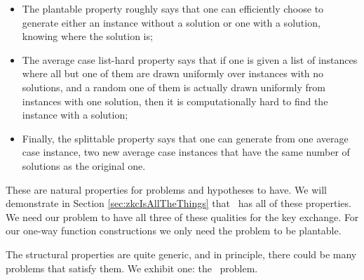 \begin{itemize}
	\item The plantable property roughly says that one can efficiently choose to generate either an instance without a solution or one with a solution, knowing where the solution is; %
	\item The average case list-hard property says that if one is given a list of instances where all but one of them are drawn uniformly over instances with no solutions, and a random one of them is actually drawn uniformly from instances with one solution, then it is computationally hard to find the instance with a solution;
	\item Finally, the splittable property says that one can generate from one average case instance, two new average case instances that have the same number of solutions as the original one. %
\end{itemize}
These are natural properties for problems and hypotheses to have. We will demonstrate in Section \ref{sec:zkcIsAllTheThings} that \zkclique~has all of these properties. We need our problem to have all three of these qualities for the key exchange. For our one-way function constructions we only need the problem to be plantable.



The structural properties are quite generic, and in principle, there could be many problems that satisfy them. We exhibit one: the \zkclique~problem.

